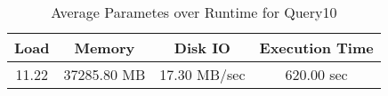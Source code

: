 \documentclass[../../main.tex]{subfiles}
\begin{document}
    \begin{table}
        \begin{center}
            \begin{tabular}{ |c|c|c|c| } 
            \hline
            Load & Memory & Disk IO & Execution Time\\
            \hline
            11.22 & 37285.80 MB & 17.30 MB/sec & 620.00 sec \\
            \hline
            \end{tabular}
            \\[1pt]
            \caption{Average Parametes over Runtime for Query10}
        \end{center}
    \end{table}
    \pagebreak
\end{document}

